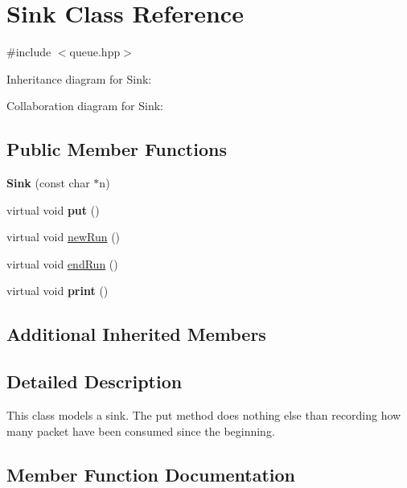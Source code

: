 \hypertarget{classSink}{}\section{Sink Class Reference}
\label{classSink}


{\ttfamily \#include $<$queue.\+hpp$>$}



Inheritance diagram for Sink\+:


Collaboration diagram for Sink\+:
\subsection*{Public Member Functions}
\begin{DoxyCompactItemize}
\item 
{\bfseries Sink} (const char $\ast$n)\hypertarget{classSink_affe901a340efd99f7dccdf7b544c1fa4}{}\label{classSink_affe901a340efd99f7dccdf7b544c1fa4}

\item 
virtual void {\bfseries put} ()\hypertarget{classSink_a5655befd902c442853a4786d6227186e}{}\label{classSink_a5655befd902c442853a4786d6227186e}

\item 
virtual void \hyperlink{classSink_a39d08501b759e325aec611e6fc9ef851}{new\+Run} ()
\item 
virtual void \hyperlink{classSink_a275769d09eaf4bbdb2a5fae38c37aa92}{end\+Run} ()
\item 
virtual void {\bfseries print} ()\hypertarget{classSink_a9cd8318c717c1b7f787e4a523ca654bb}{}\label{classSink_a9cd8318c717c1b7f787e4a523ca654bb}

\end{DoxyCompactItemize}
\subsection*{Additional Inherited Members}


\subsection{Detailed Description}
This class models a sink. The put method does nothing else than recording how many packet have been consumed since the beginning. 

\subsection{Member Function Documentation}

